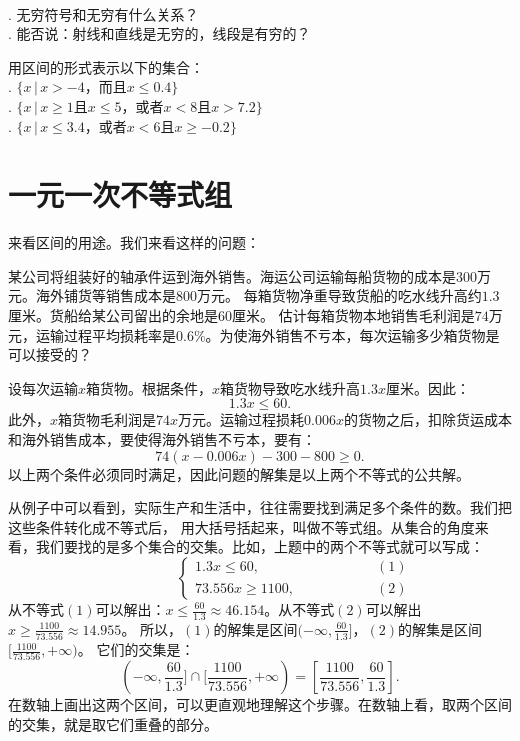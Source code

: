 \documentclass[12pt,UTF8,fontset=none]{ctexbook}
\begin{document}
\begin{sk}\label{sk:5-4-0}
    \mbox{}\\
    . 无穷符号和无穷有什么关系？\\
    . 能否说：射线和直线是无穷的，线段是有穷的？
\end{sk}
\begin{xt}\label{xt:5-4-0}
    用区间的形式表示以下的集合：\\
    . $\{x \, | \, x > -4 \mbox{，而且} x \leqslant 0.4 \}$ \\
    . $\{x \, | \, x \geqslant 1 \mbox{且} x \leqslant 5 \mbox{，或者} x < 8  \mbox{且} x > 7.2 \}$ \\
    . $\{x \, | \, x \leqslant 3.4 \mbox{，或者} x < 6  \mbox{且} x \geqslant -0.2 \}$
\end{xt}

\section{一元一次不等式组}
来看区间的用途。我们来看这样的问题：
\begin{ex}\label{ex:5-5-0}
    某公司将组装好的轴承件运到海外销售。海运公司运输每船货物的成本是$300$万元。海外铺货等销售成本是$800$万元。
    每箱货物净重导致货船的吃水线升高约$1.3$厘米。货船给某公司留出的余地是$60$厘米。
    估计每箱货物本地销售毛利润是$74$万元，运输过程平均损耗率是$0.6\%$。为使海外销售不亏本，每次运输多少箱货物是可以接受的？
\end{ex}

\begin{so}
    设每次运输$x$箱货物。根据条件，$x$箱货物导致吃水线升高$1.3x$厘米。因此：
    $$ 1.3x \leqslant  60.$$
    此外，$x$箱货物毛利润是$74x$万元。运输过程损耗$0.006x$的货物之后，扣除货运成本和海外销售成本，要使得海外销售不亏本，要有：
    $$ 74 (x - 0.006x) - 300 - 800 \geqslant 0. $$
    以上两个条件必须同时满足，因此问题的解集是以上两个不等式的公共解。
\end{so}

从例子中可以看到，实际生产和生活中，往往需要找到满足多个条件的数。我们把这些条件转化成不等式后，
用大括号括起来，叫做不等式组。从集合的角度来看，我们要找的是多个集合的交集。比如，上题中的两个不等式就可以写成：
$$ \quad \quad \quad \quad \quad\left\{
\begin{array}{cr}
    1.3x \leqslant 60, & \quad \quad \quad \quad \quad (1) \\
    73.556x \geqslant 1100, & \quad \quad \quad \quad \quad (2)
\end{array}\right.
$$
从不等式$(1)$可以解出：$x \leqslant \frac{60}{1.3} \approx 46.154$。从不等式$(2)$可以解出$x \geqslant \frac{1100}{73.556} \approx 14.955$。
所以，$(1)$的解集是区间$(-\infty, \frac{60}{1.3}]$，$(2)$的解集是区间$[\frac{1100}{73.556}, +\infty)$。
它们的交集是：
$$(-\infty, \frac{60}{1.3}] \cap [\frac{1100}{73.556}, +\infty)  = [\frac{1100}{73.556}, \frac{60}{1.3}]. $$
在数轴上画出这两个区间，可以更直观地理解这个步骤。在数轴上看，取两个区间的交集，就是取它们重叠的部分。
\end{document}
